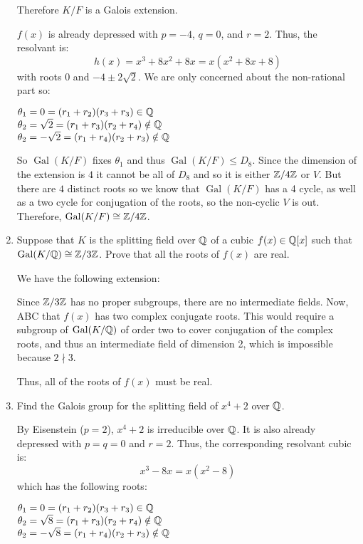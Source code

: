 \documentclass[letterpaper,12pt,fleqn]{article}
\renewcommand{\o}{\theta}
\DeclareMathOperator{\Gal}{Gal}
\begin{document}
\begin{enumerate}
  Therefore $K/F$ is a Galois extension.

  $f(x)$ is already depressed with $p=-4$, $q=0$, and $r=2$. Thus, the resolvant is:
  \[h(x)=x^3+8x^2+8x=x(x^2+8x+8)\]
  with roots $0$ and $-4\pm2\sqrt{2}$. We are only concerned about the non-rational
  part so:

  $\o_1=0=(r_1+r_2)(r_3+r_3)\in\Q$ \\
  $\o_2=\sqrt{2}=(r_1+r_3)(r_2+r_4)\notin\Q$ \\
  $\o_2=-\sqrt{2}=(r_1+r_4)(r_2+r_3)\notin\Q$

  So $\Gal(K/F)$ fixes $\o_1$ and thus $\Gal(K/F)\le D_8$. Since the dimension of the
  extension is $4$ it cannot be all of $D_8$ and so it is either $\mathbb{Z}/4\mathbb{Z}$ or $V$. But
  there are $4$ distinct roots so we know that $\Gal(K/F)$ has a 4 cycle, as well as a
  two cycle for conjugation of the roots, so the non-cyclic $V$ is out. Therefore,
  $\Gal(K/F)\cong\Z/4\Z$.

\item Suppose that $K$ is the splitting field over $\mathbb{Q}$ of a cubic $f(x)\in\mathbb{Q}[x]$ such
  that $\Gal(K/\Q)\cong\Z/3\Z$. Prove that all the roots of $f(x)$ are real.

  We have the following extension:


  Since $\mathbb{Z}/3\mathbb{Z}$ has no proper subgroups, there are no intermediate fields. Now, ABC
  that $f(x)$ has two complex conjugate roots. This would require a subgroup of
  $\Gal(K/\Q)$ of order two to cover conjugation of the complex roots, and thus an
  intermediate field of dimension 2, which is impossible because $2\nmid 3$.

  Thus, all of the roots of $f(x)$ must be real.

\item Find the Galois group for the splitting field of $x^4+2$ over $\mathbb{Q}$.

  By Eisenstein ($p=2$), $x^4+2$ is irreducible over $\mathbb{Q}$. It is also already depressed
  with $p=q=0$ and $r=2$. Thus, the corresponding resolvant cubic is:
  \[x^3-8x=x(x^2-8)\]
  which has the following roots:

  $\o_1=0=(r_1+r_2)(r_3+r_3)\in\Q$ \\
  $\o_2=\sqrt{8}=(r_1+r_3)(r_2+r_4)\notin\Q$ \\
  $\o_2=-\sqrt{8}=(r_1+r_4)(r_2+r_3)\notin\Q$


\end{enumerate}
\end{document}

